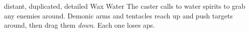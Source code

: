   {distant, duplicated, detailed}%
  {Wax}%
  {Water}%
  {}%
  {The caster calls to water spirits to grab any enemies around.
    Demonic arms and tentacles reach up and push targets around, then drag them \emph{down}.
    Each one loses  \glspl{ap}.}%
  {}
